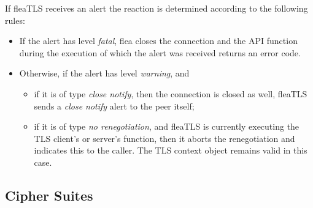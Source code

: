 \documentclass[a4paper,11pt]{scrartcl}
\begin{document}
  If fleaTLS receives an alert the reaction is determined according to the
  following rules:
  \begin{itemize}
    \item If the alert has level \emph{fatal}, flea closes the connection and the API
        function during the execution of which the alert was received returns an
        error code.
      \item Otherwise, if the alert has level \emph{warning}, and
        \begin{itemize}
          \item if it is of type \emph{close notify}, then the connection is closed as
            well, \ie fleaTLS sends a \emph{close notify} alert to the peer itself;
          \item if it is of type \emph{no renegotiation}, and fleaTLS is
            currently executing the TLS client's or server's
             function, then it aborts the renegotiation and
            indicates this to the caller. The TLS context object remains valid in
            this case.

  \end{itemize}
  \end{itemize}

\subsection{Cipher Suites}
\end{document}
